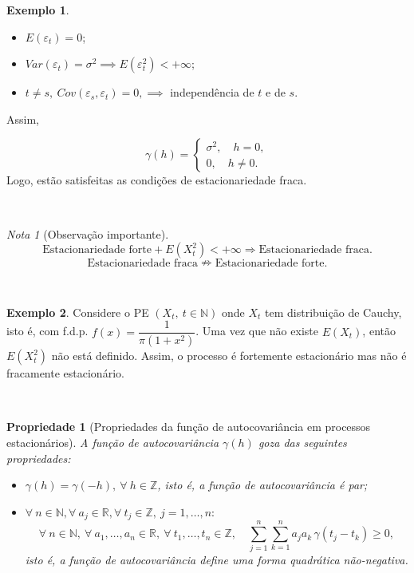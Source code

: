 \documentclass[
  11pt,
  a4paper,
]{book}
\newtheorem{proposition}{Propriedade}[chapter]
\theoremstyle{definition}
\theoremstyle{definition}
\newtheorem{example}{Exemplo}[chapter]
\theoremstyle{definition}
\theoremstyle{definition}
\theoremstyle{remark}
\newtheorem*{remark}{Nota }
\begin{document}
\begin{example}
\leavevmode

\begin{itemize}
\item
  \(E(\varepsilon_t)=0\);
\item
  \(Var(\varepsilon_t)=\sigma^2 \implies E(\varepsilon^2_t) < + \infty\);
\item
  \(t \neq s, ~Cov(\varepsilon_s,\varepsilon_t)=0, \implies\) independência de \(t\) e de \(s\).
\end{itemize}

Assim,

\[
\gamma(h)=
\begin{cases}
\sigma^2, \quad h=0,\\
0, \quad h \neq 0.
\end{cases}
\] Logo, estão satisfeitas as condições de estacionariedade fraca.

\end{example}

\(\,\)

\begin{remark}[Observação importante]
\[\text{Estacionariedade forte} + E(X_t^2) <+\infty \Rightarrow \text{Estacionariedade fraca}.\]
\[\text{Estacionariedade fraca} \nRightarrow \text{Estacionariedade forte}.\]
\end{remark}

\(\,\)

\begin{example}
Considere o PE \((X_t, ~t \in \mathbb{N})\) onde \(X_t\) tem distribuição de Cauchy, isto é, com
f.d.p. \(f(x)=\dfrac{1}{\pi(1+x^2)}\). Uma vez que não existe \(E(X_t)\), então \(E(X_t^2)\) não
está definido. Assim, o processo é fortemente estacionário mas não é fracamente
estacionário.
\end{example}

\(\,\)

\begin{proposition}[Propriedades da função de autocovariância em processos estacionários]

A função de autocovariância \(\gamma(h)\) goza das seguintes propriedades:

\begin{itemize}
\item
  \(\gamma(h)=\gamma(-h), ~ \forall ~h \in \mathbb{Z}\), isto é, a função de autocovariância é
  par;
\item
  \(\forall ~n \in \mathbb{N}, \forall ~a_j \in \mathbb{R}, \forall ~t_j \in \mathbb{Z}, ~j=1, \ldots,n:\)
  \[\forall~n \in \mathbb{N},~ \forall~a_1, \ldots, a_n \in \mathbb{R},~ \forall~t_1, \ldots, t_n \in \mathbb{Z}, \quad
    \sum_{j=1}^{n} \sum_{k=1}^{n} a_j a_k\, \gamma(t_j - t_k) \geq 0,\]
  isto é, a função de autocovariância define uma forma quadrática não-negativa.
\end{itemize}

\end{proposition}
\end{document}
